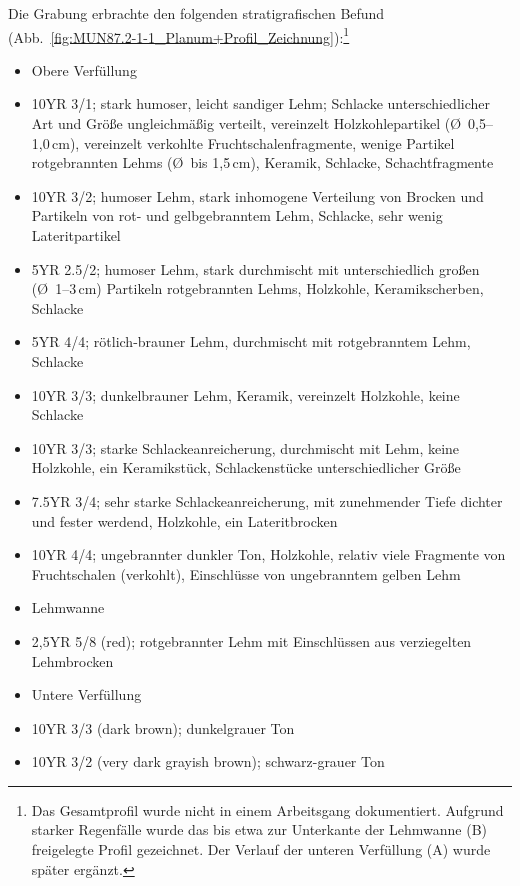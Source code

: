 \vspace{1.5em}
\noindent Die Grabung erbrachte den folgenden stratigrafischen Befund (Abb.~\ref{fig:MUN87.2-1-1_Planum+Profil_Zeichnung}):\footnote{Das Gesamtprofil wurde nicht in einem Arbeitsgang dokumentiert. Aufgrund starker Regenfälle wurde das bis etwa zur Unterkante der Lehmwanne (B) freigelegte Profil gezeichnet. Der Verlauf der unteren Verfüllung (A) wurde später ergänzt.}
\begin{itemize}[leftmargin=*, labelindent=1.25em, noitemsep, topsep=0pt]
\item [C] Obere Verfüllung
\item [(1)] 10YR 3/1; stark humoser, leicht sandiger Lehm; Schlacke unterschiedlicher Art und Größe ungleichmäßig verteilt, vereinzelt Holzkohlepartikel (\O~0,5--1,0\,cm), vereinzelt verkohlte Fruchtschalenfragmente, wenige Partikel rotgebrannten Lehms (\O~bis 1,5\,cm), Keramik, Schlacke, Schachtfragmente
\item [(2)] 10YR 3/2; humoser Lehm, stark inhomogene Verteilung von Brocken und Partikeln von rot- und gelbgebranntem Lehm, Schlacke, sehr wenig Lateritpartikel
\item [(4)] 5YR 2.5/2; humoser Lehm, stark durchmischt mit unterschiedlich großen (\O~1--3\,cm) Partikeln rotgebrannten Lehms, Holzkohle, Keramikscherben, Schlacke
\item [(5)] 5YR 4/4; rötlich-brauner Lehm, durchmischt mit rotgebranntem Lehm, Schlacke
\item [(6)] 10YR 3/3; dunkelbrauner Lehm, Keramik, vereinzelt Holzkohle, keine Schlacke
\item [(7)] 10YR 3/3; starke Schlackeanreicherung, durchmischt mit Lehm, keine Holzkohle, ein Keramikstück, Schlackenstücke unterschiedlicher Größe
\item [(8)] 7.5YR 3/4; sehr starke Schlackeanreicherung, mit zunehmender Tiefe dichter und fester werdend, Holzkohle, ein Lateritbrocken
\item [(9)] 10YR 4/4; ungebrannter dunkler Ton, Holzkohle, relativ viele Fragmente von Fruchtschalen (verkohlt), Einschlüsse von ungebranntem gelben Lehm
\item [B] Lehmwanne
\item [(3)] 2,5YR 5/8 (red); rotgebrannter Lehm mit Einschlüssen aus verziegelten Lehmbrocken
\item [A] Untere Verfüllung
\item [(12)] 10YR 3/3 (dark brown); dunkelgrauer Ton
\item [(13)] 10YR 3/2 (very dark grayish brown); schwarz-grauer Ton
\end{itemize}

